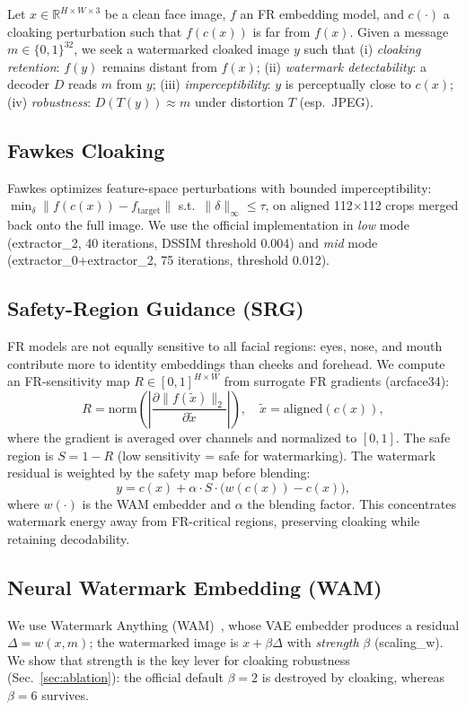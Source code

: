 \documentclass[preprint,12pt]{elsarticle}
\begin{document}
Let $x \in \mathbb{R}^{H\times W\times 3}$ be a clean face image, $f$ an FR embedding model, and $c(\cdot)$ a cloaking perturbation such that $f(c(x))$ is far from $f(x)$. Given a message $m \in \{0,1\}^{32}$, we seek a watermarked cloaked image $y$ such that (i) \emph{cloaking retention}: $f(y)$ remains distant from $f(x)$; (ii) \emph{watermark detectability}: a decoder $D$ reads $m$ from $y$; (iii) \emph{imperceptibility}: $y$ is perceptually close to $c(x)$; (iv) \emph{robustness}: $D(T(y)) \approx m$ under distortion $T$ (esp.\ JPEG).

\subsection{Fawkes Cloaking}
Fawkes optimizes feature-space perturbations with bounded imperceptibility: $\min_\delta \|f(c(x)) - f_{\mathrm{target}}\|$ s.t.\ $\|\delta\|_\infty \le \tau$, on aligned 112$\times$112 crops merged back onto the full image. We use the official implementation in \emph{low} mode (extractor\_2, 40 iterations, DSSIM threshold 0.004) and \emph{mid} mode (extractor\_0+extractor\_2, 75 iterations, threshold 0.012).

\subsection{Safety-Region Guidance (SRG)}
FR models are not equally sensitive to all facial regions: eyes, nose, and mouth contribute more to identity embeddings than cheeks and forehead. We compute an FR-sensitivity map $R \in [0,1]^{H\times W}$ from surrogate FR gradients (arcface34):
\begin{equation}
R = \mathrm{norm}\!\left(\left|\frac{\partial \|f(\tilde{x})\|_2}{\partial \tilde{x}}\right|\right), \quad \tilde{x} = \mathrm{aligned}(c(x)),
\label{eq:saliency}
\end{equation}
where the gradient is averaged over channels and normalized to $[0,1]$. The safe region is $S = 1 - R$ (low sensitivity = safe for watermarking). The watermark residual is weighted by the safety map before blending:
\begin{equation}
y = c(x) + \alpha \cdot S \cdot \big(w(c(x)) - c(x)\big),
\label{eq:srg}
\end{equation}
where $w(\cdot)$ is the WAM embedder and $\alpha$ the blending factor. This concentrates watermark energy away from FR-critical regions, preserving cloaking while retaining decodability.

\subsection{Neural Watermark Embedding (WAM)}
We use Watermark Anything (WAM)~\cite{ruiz2024wam}, whose VAE embedder produces a residual $\Delta = w(x,m)$; the watermarked image is $x + \beta \Delta$ with \emph{strength} $\beta$ (scaling\_w). We show that strength is the key lever for cloaking robustness (Sec.~\ref{sec:ablation}): the official default $\beta=2$ is destroyed by cloaking, whereas $\beta=6$ survives.
\end{document}
